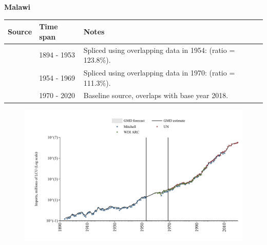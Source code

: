 \documentclass[12pt,a4paper,landscape]{article}
\begin{document}
\begin{adjustbox}{max totalsize={\paperwidth}{\paperheight},center}
\begin{minipage}[t][\textheight][t]{\textwidth}
\vspace*{0.5cm}
{}
\begin{center}
{\Large\bfseries Malawi}
\end{center}
\vspace{0.5cm}
\begin{table}[H]
\centering
\small
\begin{tabular}{|l|l|l|}
\hline
\textbf{Source} & \textbf{Time span} & \textbf{Notes} \\
\hline
\rowcolor{white}\cite{Mitchell}& 1894 - 1953 &Spliced using overlapping data in 1954: (ratio = 123.8\%).\\
\rowcolor{lightgray}\cite{WDI_ARC}& 1954 - 1969 &Spliced using overlapping data in 1970: (ratio = 111.3\%).\\
\rowcolor{white}\cite{UN}& 1970 - 2020 &Baseline source, overlaps with base year 2018.\\
\hline
\end{tabular}
\end{table}
\begin{figure}[H]
\centering
\includegraphics[width=\textwidth,height=0.6\textheight,keepaspectratio]{graphs/MWI_imports.pdf}
\end{figure}
\end{minipage}
\end{adjustbox}
\end{document}
